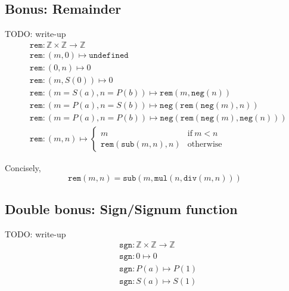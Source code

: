 \documentclass{article}
\newcommand{\Z}{\mathbb{Z}}
\newcommand{\ttneg}{\mathtt{neg}}
\newcommand{\ttsub}{\mathtt{sub}}
\newcommand{\ttmul}{\mathtt{mul}}
\newcommand{\ttdiv}{\mathtt{div}}
\newcommand{\ttrem}{\mathtt{rem}}
\begin{document}
\subsection*{Bonus: Remainder}
TODO: write-up
\begin{align*}
&{} \ttrem : \Z \times \Z \to \Z \\
&{} \ttrem : (m, 0) \mapsto \mathtt{undefined} \\
&{} \ttrem : (0, n) \mapsto 0 \\
&{} \ttrem : (m, S(0)) \mapsto 0 \\
&{} \ttrem : (m=S(a), n=P(b)) \mapsto \ttrem(m, \ttneg(n)) \\
&{} \ttrem : (m=P(a), n=S(b)) \mapsto \ttneg(\ttrem(\ttneg(m), n)) \\
&{} \ttrem : (m=P(a), n=P(b)) \mapsto \ttneg(\ttrem(\ttneg(m), \ttneg(n))) \\
&{} \ttrem : (m, n) \mapsto \begin{cases}
m & \text{if} ~ m < n \\
\ttrem(\ttsub(m, n), n) & \text{otherwise}
\end{cases}
\end{align*}

Concisely,
\[ \ttrem(m, n) = \ttsub(m, \ttmul(n, \ttdiv(m, n))) \]

\subsection*{Double bonus: Sign/Signum function}
TODO: write-up
\begin{align*}
&{} \mathtt{sgn} : \Z \times \Z \to \Z \\
&{} \mathtt{sgn} : 0 \mapsto 0 \\
&{} \mathtt{sgn} : P(a) \mapsto P(1) \\
&{} \mathtt{sgn} : S(a) \mapsto S(1) \\
\end{align*}
\end{document}
